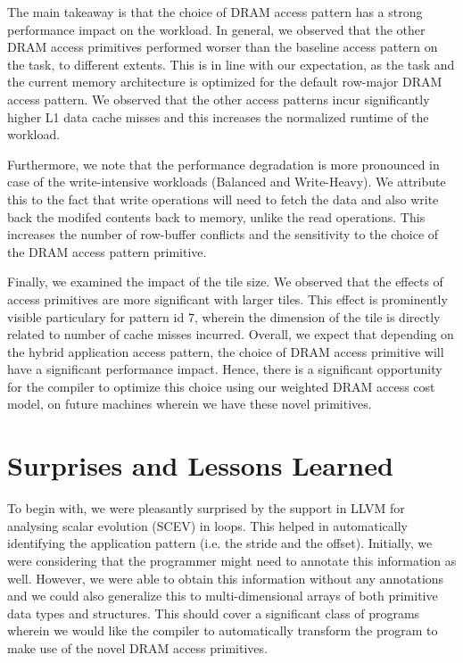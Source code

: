 \documentclass[letterpaper]{article}
\begin{document}
The main takeaway is that the choice of DRAM access pattern has a strong
performance impact on the workload. In general, we observed that the other
DRAM access primitives performed worser than the baseline access pattern
on the task, to different extents.
This is in line with our expectation, as the task and the current memory
architecture is optimized for the default row-major DRAM access pattern.
We observed that the other access patterns incur significantly higher L1
data cache misses and this increases the normalized runtime of the workload.

Furthermore, we note that the performance degradation is more
pronounced in case of the write-intensive workloads (Balanced and Write-Heavy).
We attribute this to the fact that write operations will need to 
fetch the data and also write back the modifed contents back to memory,
unlike the read operations. This increases the number of row-buffer
conflicts and the sensitivity to the choice of the DRAM access pattern
primitive.

Finally, we examined the impact of the tile size. We observed that the effects
of access primitives are more significant with larger tiles. 
This effect is prominently visible particulary for pattern id 7, wherein the
dimension of the tile is directly related to number of cache misses incurred.
Overall, we expect that depending on the hybrid application access pattern,
the choice of DRAM access primitive will have a significant performance impact.
Hence, there is a significant opportunity for the compiler to optimize this
choice using our weighted DRAM access cost model, on future machines wherein we
have these novel primitives.

\section{Surprises and Lessons Learned}

To begin with, we were pleasantly surprised by the support in LLVM for 
analysing scalar evolution (SCEV) in loops. This helped in automatically
identifying the application pattern (i.e. the stride and the offset).
Initially, we were considering that the programmer might need to annotate 
this information as well.
However, we were able to obtain this information without any annotations and
we could also generalize this to multi-dimensional arrays of both primitive
data types and structures. This should cover a significant class of programs
wherein we would like the compiler to automatically transform the program
to make use of the novel DRAM access primitives.
\end{document}
